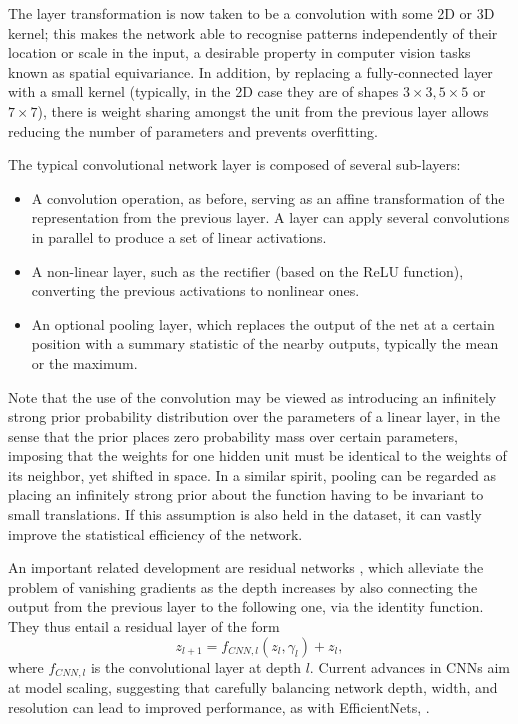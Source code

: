  The layer transformation is now taken to be a convolution with some 2D or 3D kernel; this makes the network able to recognise patterns independently of their location or scale in the input, a desirable property in computer vision tasks known as spatial equivariance. In addition, by replacing a fully-connected layer with a small kernel (typically, in the 2D case they are of shapes $3\times3, 5\times 5$ or $7\times 7$), there is weight sharing amongst the unit from the previous layer allows reducing 
 the number of parameters and prevents overfitting.
 
 The typical convolutional network layer is composed of several sub-layers:
 \begin{itemize}
     \item A convolution operation, as before, 
     serving as an affine transformation of the representation from the previous layer. A layer can apply several convolutions in parallel to produce a set of linear activations.
     \item A non-linear layer, such as the rectifier (based on the ReLU function), converting the previous activations to nonlinear ones.
     \item An optional pooling layer, which replaces the output of the net at a certain position with a summary statistic of 
     the nearby outputs, 
     typically the mean or the maximum.  
 \end{itemize}
 
 Note that the use of the convolution may be viewed as introducing an inﬁnitely strong prior probability distribution over the parameters of a linear layer, in the sense that the prior places zero probability mass over certain parameters, imposing that the weights for one hidden unit must be identical to the weights of its neighbor, yet shifted in space. In a 
  similar spirit, pooling can be regarded as placing an inﬁnitely strong prior about the function having to be invariant to small translations. If this assumption is also held in the dataset, it can vastly improve the statistical eﬃciency of the network.
 
 An important related development are residual networks \citep{he2016deep}, which alleviate the problem of vanishing gradients as the depth increases by also connecting the output from the previous layer to the following one, via the identity function. They thus 
 entail a residual layer of the form 
$$
z_{l+1} = f_{CNN,l}(z_l, \gamma_l) + z_l ,
$$
where $f_{CNN,l}$ is the convolutional layer at depth $l$. Current advances in CNNs aim at model scaling, suggesting that carefully balancing network depth, width, and resolution can lead to improved performance,
as with EfficientNets, \cite{tan2019efficientnet}.



